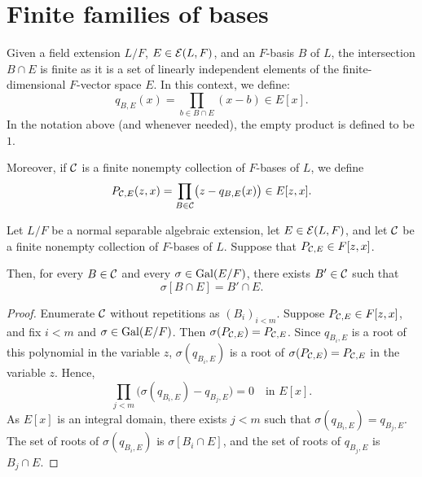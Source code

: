 \section{Finite families of bases}\label{sec:finite}

Given a field extension $L/F$, $E\in\mathcal E(L,F)$, and an $F$-basis $B$ of $L$, the intersection $B\cap E$ is finite as it is a set of linearly independent elements of the finite-dimensional $F$-vector space $E$.
In this context, we define:
\[
       q_{B,E}(x)=\prod_{b\in B\cap E}(x-b)\in E[x].
\]
In the notation above (and whenever needed), the empty product is defined to be $1$.

Moreover, if $\mathcal C$ is a finite nonempty collection of $F$-bases of $L$, we define
\[
 P_{\mathcal C,E}(z,x)=\prod_{B\in\mathcal C}\bigl(z-q_{B,E}(x)\bigr)\in E[z,x].
\]

\begin{lemma}\label{lem:basis-polynomials}
Let $L/F$ be a normal separable algebraic extension, let
$E\in\mathcal E(L,F)$, and let $\mathcal C$ be a finite nonempty collection
of $F$-bases of $L$. Suppose that $P_{\mathcal C,E}\in F[z,x]$.

Then, for every $B\in\mathcal C$ and every $\sigma\in\operatorname{Gal}(E/F)$,
there exists $B'\in\mathcal C$ such that
\[
 \sigma[B\cap E]=B'\cap E.
\]
\end{lemma}

\begin{proof}
Enumerate $\mathcal C$ without repetitions as $(B_i)_{i<m}$.
Suppose $P_{\mathcal C,E}\in F[z,x]$, and fix $i<m$
and $\sigma\in\operatorname{Gal}(E/F)$.
Then $\sigma(P_{\mathcal C,E})=P_{\mathcal C,E}$.
Since $q_{B_i,E}$ is a root of this polynomial in the variable $z$,
$\sigma(q_{B_i,E})$ is a root of
$\sigma(P_{\mathcal C,E})=P_{\mathcal C,E}$ in the variable $z$.
Hence,
\[
 \prod_{j<m}
       \bigl(\sigma(q_{B_i,E})-q_{B_j,E}\bigr)=0
       \quad\text{in }E[x].
\]
As $E[x]$ is an integral domain, there exists $j<m$
such that $\sigma(q_{B_i,E})=q_{B_j,E}$.
The set of roots of $\sigma(q_{B_i,E})$ is
$\sigma[B_i\cap E]$, and the set of roots of $q_{B_j,E}$
is $B_j\cap E$.
\end{proof}

